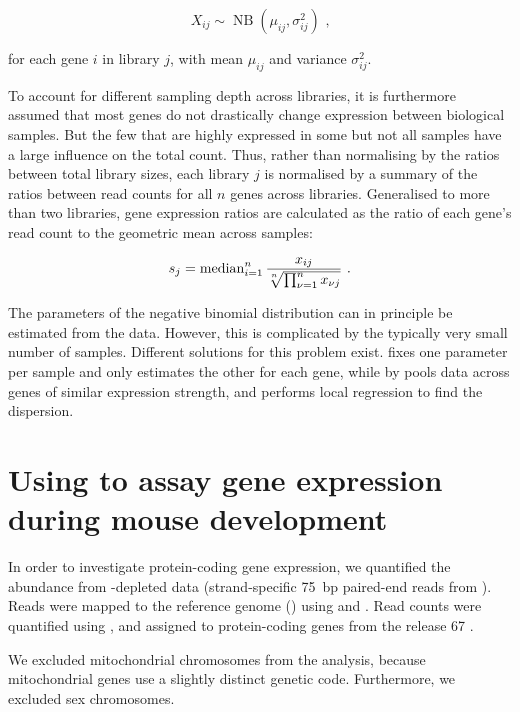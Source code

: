 \begin{equation}
    X_{ij} \sim \operatorname{NB}(\mu_{ij}, \sigma^2_{ij}) \text{\ ,}
\end{equation}

for each gene \(i\) in library \(j\), with mean \(\mu_{ij}\) and variance
\(\sigma^2_{ij}\).

To account for different sampling depth across libraries, it is furthermore
assumed that most genes do not drastically change expression between biological
samples. But the few that are highly expressed in some but not all samples have
a large influence on the total count. Thus, rather than normalising by the
ratios between total library sizes, each library \(j\) is normalised by a
summary of the ratios between read counts for all \(n\) genes across libraries.
Generalised to more than two libraries, gene expression ratios are calculated as
the ratio of each gene’s read count to the geometric mean across samples:

\begin{equation}
    s_j = \operatorname{median}_{i = 1}^n
        \frac{x_{ij}}{\sqrt[\uproot{2}n]{\prod_{\nu = 1}^n x_{\nu j}}}
        \text{\ .}
\end{equation}

The parameters of the negative binomial distribution can in principle be
estimated from the data. However, this is complicated by the typically very
small number of samples. Different solutions for this problem exist.
 \citep{Robinson:2010} fixes one parameter per sample and only
estimates the other for each gene, while  by \citet{Anders:2010}
pools data across genes of similar expression strength, and performs local
regression to find the dispersion.

\section{Using  to assay gene expression during mouse development}

In order to investigate protein-coding gene expression, we quantified the \mrna
abundance from \rrna-depleted \rnaseq data (strand-specific \SI{75}{bp}
paired-end reads from  ). Reads were mapped to
the \mmu reference genome () using 
\citep{Fonseca:2014} and  \citep{Kim:2013}. Read counts were
quantified using  \citep{Anders:2014}, and assigned to
protein-coding genes from the  release \num{67}
\citep{Flicek:2014}.

We excluded mitochondrial chromosomes from the analysis, because mitochondrial
genes use a slightly distinct genetic code\todo[ref]{}. Furthermore, we excluded
sex chromosomes.
